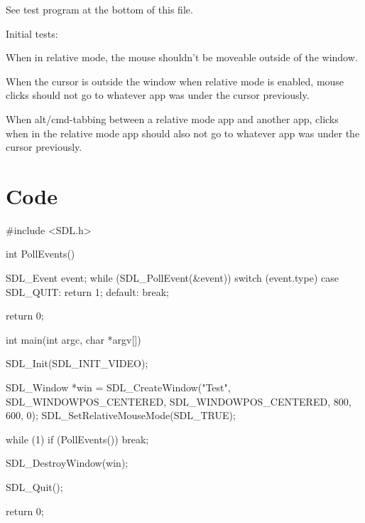 See test program at the bottom of this file.

Initial tests\+:


\begin{DoxyItemize}
\item When in relative mode, the mouse shouldn't be moveable outside of the window.
\item When the cursor is outside the window when relative mode is enabled, mouse clicks should not go to whatever app was under the cursor previously.
\item When alt/cmd-\/tabbing between a relative mode app and another app, clicks when in the relative mode app should also not go to whatever app was under the cursor previously.
\end{DoxyItemize}

\section*{Code }

\begin{DoxyVerb}#include <SDL.h>

int PollEvents()
{
    SDL_Event event;
    while (SDL_PollEvent(&event))
    {
        switch (event.type)
        {
            case SDL_QUIT:
                return 1;
            default:
                break;
        }
    }

    return 0;
}

int main(int argc, char *argv[])
{
    SDL_Init(SDL_INIT_VIDEO);

    SDL_Window *win = SDL_CreateWindow("Test", SDL_WINDOWPOS_CENTERED, SDL_WINDOWPOS_CENTERED, 800, 600, 0);
    SDL_SetRelativeMouseMode(SDL_TRUE);

    while (1)
    {
        if (PollEvents())
            break;
    }

    SDL_DestroyWindow(win);

    SDL_Quit();

    return 0;
}\end{DoxyVerb}
 